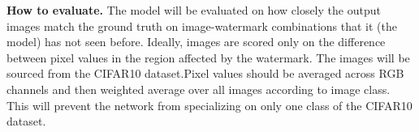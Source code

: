 \documentclass[11pt]{article}
\begin{document}
\begin{sloppypar}
\textbf{How to evaluate.}
The model will be evaluated on how closely the output images match the ground truth on image-watermark combinations that it (the model) has not seen before. Ideally, images are scored only on the difference between pixel values in the region affected by the watermark. The images will be sourced from the CIFAR10 dataset.Pixel values should be averaged across RGB channels and then weighted average over all images according to image class. This will prevent the network from specializing on only one class of the CIFAR10 dataset.
\end{sloppypar}

\newpage



\pagebreak


% 
%
% 

\end{document}
